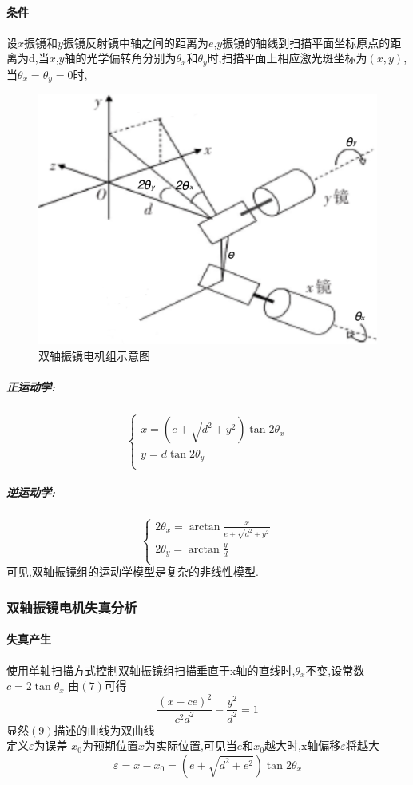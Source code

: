 \documentclass[a4paper,12pt,onecolumn,twoside]{article}
\begin{document}
\paragraph{条件}
设$x$振镜和$y$振镜反射镜中轴之间的距离为$e$,$y$振镜的轴线到扫描平面坐标原点的距离为d,当$x$,$y$轴的光学偏转角分别为$\theta_x$和$\theta_y$时,扫描平面上相应激光斑坐标为$(x,y)$,当$\theta_x=\theta_y=0$时,
\begin{figure}[htbp]
\includegraphics[width=\linewidth]{MG6.png}
\caption{双轴振镜电机组示意图}
\end{figure}
\subparagraph{正运动学:}
\begin{equation}
\left\{
\begin{array}{l}
x=(e+\sqrt{d^2+y^2})\tan 2\theta_x \\
y=d\tan 2\theta_y \\
\end{array}
\right.
\end{equation}
\subparagraph{逆运动学:}
\begin{equation}
\left\{
\begin{array}{l}
2\theta_x = \arctan \frac{x}{e+\sqrt{d^2+y^2}}  \\
2\theta_y = \arctan \frac{y}{d} \\
\end{array}
\right.
\end{equation}
可见,双轴振镜组的运动学模型是复杂的非线性模型.
\newpage
\subsubsection{双轴振镜电机失真分析}
\paragraph{失真产生}
使用单轴扫描方式控制双轴振镜组扫描垂直于x轴的直线时,$\theta_x$不变,设常数$c=2\tan\theta_x$
由$(7)$可得
\begin{equation}
\frac{(x-ce)^2}{c^2 d^2}-\frac{y^2}{d^2}=1
\end{equation}
显然$(9)$描述的曲线为双曲线\\
定义$\varepsilon$为误差 $x_0$为预期位置$x$为实际位置,可见当$e$和$x_0$越大时,x轴偏移$\varepsilon$将越大
\begin{equation}
\varepsilon=x-x_0=(e+\sqrt{d^2+e^2})\tan2\theta_x
\end{equation}
\end{document}
